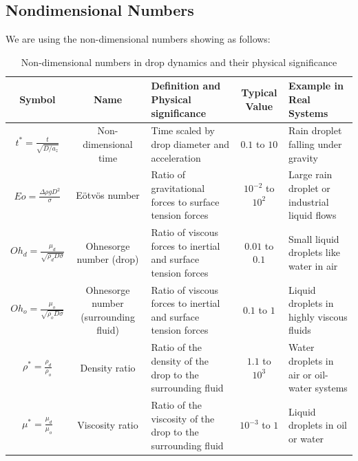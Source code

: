 \documentclass[12pt]{article}
\begin{document}
\subsection{Nondimensional Numbers}






We are using the non-dimensional numbers showing as follows:


\begin{table}[H]
\scriptsize
\centering
\caption{Non-dimensional numbers in drop dynamics and their physical significance}
\renewcommand{\arraystretch}{1.2} %
\begin{tabularx}{\textwidth}{|c|c|X|c|X|}
\hline
\textbf{Symbol} & \textbf{Name} & \textbf{Definition and Physical significance} & \textbf{Typical Value} & \textbf{Example in Real Systems} \\ \hline
$t^* = \frac{t}{\sqrt{D/a_z}}$ & Non-dimensional time & Time scaled by drop diameter and acceleration & $0.1$ to $10$ & Rain droplet falling under gravity \\ \hline
$Eo = \frac{\Delta \rho g D^2}{\sigma}$ & Eötvös number & Ratio of gravitational forces to surface tension forces & $10^{-2}$ to $10^2$ & Large rain droplet or industrial liquid flows \\ \hline
$Oh_d = \frac{\mu_d}{\sqrt{\rho_d D \sigma}}$ & Ohnesorge number (drop) & Ratio of viscous forces to inertial and surface tension forces & $0.01$ to $0.1$ & Small liquid droplets like water in air \\ \hline
$Oh_o = \frac{\mu_o}{\sqrt{\rho_o D \sigma}}$ & Ohnesorge number (surrounding fluid) & Ratio of viscous forces to inertial and surface tension forces & $0.1$ to $1$ & Liquid droplets in highly viscous fluids \\ \hline
$\rho^* = \frac{\rho_d}{\rho_o}$ & Density ratio & Ratio of the density of the drop to the surrounding fluid & $1.1$ to $10^3$ & Water droplets in air or oil-water systems \\ \hline
$\mu^* = \frac{\mu_d}{\mu_o}$ & Viscosity ratio & Ratio of the viscosity of the drop to the surrounding fluid & $10^{-3}$ to $1$ & Liquid droplets in oil or water \\ \hline
\end{tabularx}
\label{tab:NonDimensionalNumbersSignificance}
\end{table}
\end{document}
